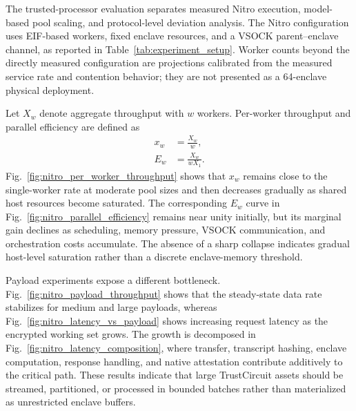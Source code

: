 \documentclass[10pt,journal,compsoc]{IEEEtran}
\begin{document}
The trusted-processor evaluation separates measured Nitro execution, model-based pool scaling, and protocol-level deviation analysis. The Nitro configuration uses EIF-based workers, fixed enclave resources, and a VSOCK parent--enclave channel, as reported in Table~\ref{tab:experiment_setup}. Worker counts beyond the directly measured configuration are projections calibrated from the measured service rate and contention behavior; they are not presented as a 64-enclave physical deployment.

Let $X_w$ denote aggregate throughput with $w$ workers. Per-worker
throughput and parallel efficiency are defined as
\begin{equation}
\begin{aligned}
x_w
&=
\frac{X_w}{w},
\\
E_w
&=
\frac{X_w}{wX_1}.
\end{aligned}
\label{eq:pool_scaling_metrics}
\end{equation}
Fig.~\ref{fig:nitro_per_worker_throughput} shows that $x_w$ remains
close to the single-worker rate at moderate pool sizes and then
decreases gradually as shared host resources become saturated.
The corresponding $E_w$ curve in
Fig.~\ref{fig:nitro_parallel_efficiency} remains near unity initially,
but its marginal gain declines as scheduling, memory pressure, VSOCK
communication, and orchestration costs accumulate. The absence of a
sharp collapse indicates gradual host-level saturation rather than a
discrete enclave-memory threshold.

Payload experiments expose a different bottleneck. Fig.~\ref{fig:nitro_payload_throughput} shows that the steady-state data rate stabilizes for medium and large payloads, whereas Fig.~\ref{fig:nitro_latency_vs_payload} shows increasing request latency as the encrypted working set grows. The growth is decomposed in Fig.~\ref{fig:nitro_latency_composition}, where transfer, transcript hashing, enclave computation, response handling, and native attestation contribute additively to the critical path. These results indicate that large TrustCircuit assets should be streamed, partitioned, or processed in bounded batches rather than materialized as unrestricted enclave buffers.
\end{document}
